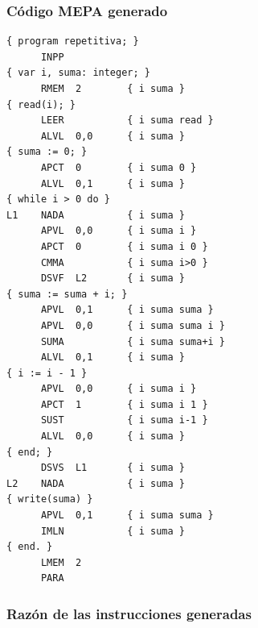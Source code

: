\documentclass[12pt]{article}
\begin{document}
\subsubsection*{Código MEPA generado}
\begin{lstlisting}[frame=single, basicstyle=\ttfamily\small, breaklines=true]
{ program repetitiva; }
      INPP
{ var i, suma: integer; }
      RMEM  2        { i suma }
{ read(i); }
      LEER           { i suma read }
      ALVL  0,0      { i suma }
{ suma := 0; }
      APCT  0        { i suma 0 }
      ALVL  0,1      { i suma }
{ while i > 0 do }
L1    NADA           { i suma }
      APVL  0,0      { i suma i }
      APCT  0        { i suma i 0 }
      CMMA           { i suma i>0 }
      DSVF  L2       { i suma }
{ suma := suma + i; }
      APVL  0,1      { i suma suma }
      APVL  0,0      { i suma suma i }
      SUMA           { i suma suma+i }
      ALVL  0,1      { i suma }
{ i := i - 1 }
      APVL  0,0      { i suma i }
      APCT  1        { i suma i 1 }
      SUST           { i suma i-1 }
      ALVL  0,0      { i suma }
{ end; }
      DSVS  L1       { i suma }
L2    NADA           { i suma }
{ write(suma) }
      APVL  0,1      { i suma suma }
      IMLN           { i suma }
{ end. }
      LMEM  2
      PARA
\end{lstlisting}

\subsubsection*{Razón de las instrucciones generadas}
\end{document}
